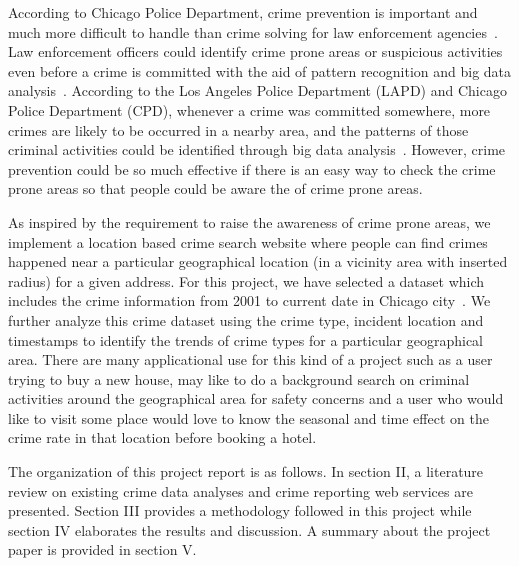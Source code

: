According to Chicago Police Department, crime prevention is important
and much more difficult to handle than crime solving for law
enforcement agencies~\cite{hid-sp18-409-www-cpd}. Law enforcement
officers could identify crime prone areas or suspicious activities
even before a crime is committed with the aid of pattern recognition
and big data analysis~\cite{hid-sp18-409-nath2006crime,
hid-sp18-409-gera2014city}.  According to the Los Angeles Police
Department (LAPD) and Chicago Police Department (CPD), whenever a
crime was committed somewhere, more crimes are likely to be occurred
in a nearby area, and the patterns of those criminal activities could
be identified through big data analysis~\cite{hid-sp18-409-www-cpd,
hid-sp18-409-www-lapd}. However, crime prevention could be so much
effective if there is an easy way to check the crime prone areas so
that people could be aware the of crime prone areas.

As inspired by the requirement to raise the awareness of crime prone
areas, we implement a location based crime search website where people
can find crimes happened near a particular geographical location (in a
vicinity area with inserted radius) for a given address. For this
project, we have selected a dataset which includes the crime
information from 2001 to current date in Chicago
city~\cite{hid-sp18-409-www-data.gov}. We further analyze this crime
dataset using the crime type, incident location and timestamps to
identify the trends of crime types for a particular geographical
area. There are many applicational use for this kind of a project such
as a user trying to buy a new house, may like to do a background
search on criminal activities around the geographical area for safety
concerns and a user who would like to visit some place would love to
know the seasonal and time effect on the crime rate in that location
before booking a hotel.

The organization of this project report is as follows. In section II,
a literature review on existing crime data analyses and crime
reporting web services are presented. Section III provides a
methodology followed in this project while section IV elaborates the
results and discussion. A summary about the project paper is provided
in section V.

